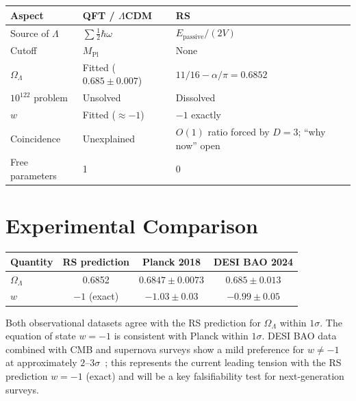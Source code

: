 \documentclass[12pt,a4paper]{article}
\theoremstyle{definition}
\theoremstyle{remark}
\begin{document}
\begin{center}
\renewcommand{\arraystretch}{1.3}
\begin{tabular}{@{}lll@{}}
\toprule
\textbf{Aspect} & \textbf{QFT / $\Lambda$CDM} & \textbf{RS} \\
\midrule
Source of $\Lambda$ & $\sum \frac{1}{2}\hbar\omega$ &
$E_{\mathrm{passive}}/(2V)$ \\
Cutoff & $M_{\mathrm{Pl}}$ & None \\
$\Omega_\Lambda$ & Fitted ($0.685 \pm 0.007$) &
$11/16 - \alpha/\pi = 0.6852$ \\
$10^{122}$ problem & Unsolved & Dissolved \\
$w$ & Fitted ($\approx -1$) & $-1$ exactly \\
Coincidence & Unexplained & $O(1)$ ratio forced by $D = 3$; ``why now'' open \\
Free parameters & 1 & 0 \\
\bottomrule
\end{tabular}
\end{center}

\section{Experimental Comparison}
\label{sec:experiment}

\begin{center}
\renewcommand{\arraystretch}{1.3}
\begin{tabular}{@{}lccc@{}}
\toprule
\textbf{Quantity} & \textbf{RS prediction} &
\textbf{Planck 2018} & \textbf{DESI BAO 2024} \\
\midrule
$\Omega_\Lambda$ & 0.6852 & $0.6847 \pm 0.0073$ &
$0.685 \pm 0.013$ \\
$w$ & $-1$ (exact) & $-1.03 \pm 0.03$ &
$-0.99 \pm 0.05$ \\
\bottomrule
\end{tabular}
\end{center}

Both observational datasets agree with the RS prediction for
$\Omega_\Lambda$ within $1\sigma$.  The equation of state $w = -1$
is consistent with Planck within $1\sigma$.  DESI BAO data combined
with CMB and supernova surveys show a mild preference for $w \neq -1$
at approximately $2$--$3\sigma$~\cite{DESI2024}; this represents the
current leading tension with the RS prediction $w = -1$ (exact)
and will be a key falsifiability test for next-generation surveys.
\end{document}
